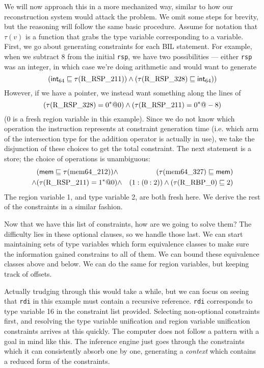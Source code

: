 We will now approach this in a more mechanized way, similar to how our reconstruction system would attack the problem. We omit some steps for brevity, but the reasoning will follow the same basic procedure. Assume for notation that $\tau(v)$ is a function that grabs the type variable corresponding to a variable. First, we go about generating constraints for each BIL statement. For example, when we subtract 8 from the initial \texttt{rsp}, we have two possibilities --- either \texttt{rsp} was an integer, in which case we're doing arithmetic and would want to generate
$$(\mathsf{int}_{64} \sqsubseteq \tau(\textrm{R\_RSP\_211})) \wedge (\tau(\textrm{R\_RSP\_328}) \sqsubseteq \mathsf{int}_{64}))$$
However, if we have a pointer, we instead want something along the lines of
$$(\tau(\textrm{R\_RSP\_328}) = 0^*@0) \wedge (\tau(\textrm{R\_RSP\_211}) = 0^*@-8)$$
(0 is a fresh region variable in this example). Since we do not know which operation the instruction represents at constraint generation time (i.e. which arm of the intersection type for the addition operator is actually in use), we take the disjunction of these choices to get the total constraint. The next statement is a store; the choice of operations is unambiguous:
\begin{align*}
& (\mathsf{mem} \sqsubseteq \tau(\textrm{mem64\_212})) \wedge& (\tau(\textrm{mem64\_327}) \sqsubseteq \mathsf{mem})\\
\wedge &(\tau(\textrm{R\_RSP\_211}) = 1^*@0) \wedge& (1 : (0 : 2)) \wedge (\tau(\textrm{R\_RBP\_0}) \sqsubseteq 2)
\end{align*}
The region variable 1, and type variable 2, are both fresh here.
We derive the rest of the constraints in a similar fashion.

Now that we have this list of constraints, how are we going to solve them? The difficulty lies in these optional clauses, so we handle those last. We can start maintaining sets of type variables which form equivalence classes to make sure the information gained constrains to all of them. We can bound these equivalence classes above and below. We can do the same for region variables, but keeping track of offsets.

Actually trudging through this would take a while, but we can focus on seeing that \texttt{rdi} in this example must contain a recursive reference. \texttt{rdi} corresponds to type variable 16 in the constraint list provided.
Selecting non-optional constraints first, and resolving the type variable unification and region variable unification constraints arrives at this quickly.
The computer does not follow a pattern with a goal in mind like this.
The inference engine just goes through the constraints which it can consistently absorb one by one, generating a \emph{context} which contains a reduced form of the constraints.

